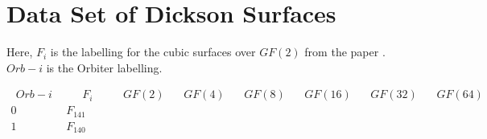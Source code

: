 \documentclass{article}
\begin{document}
{\section{Data Set of Dickson Surfaces}
Here, $F_i$ is the labelling for the cubic surfaces over $GF(2)$ from the paper \cite{karaoglu}. $Orb-i$ is the Orbiter labelling. \par

$$
\begin{array}{|r|*{7}{r|}}
\hline
\ \ Orb-i \ \ &\ \ \quad F_i \quad \ \  &\ \ GF(2)\ \ &\ \ GF(4)\ \ &\ \ GF(8)\ \ &\ \ GF(16)\ \ &\ \ GF(32)\ \ &\ \ GF(64)\ \ \\
\hline
0 
 &  F_{141}&
 & 
 & 
 & 
 & 
 & 
\\
\hline
1 
 & F_{140} &
 & 
 & 
 & 
 & 
 & 

\end{array}$$}
\end{document}

